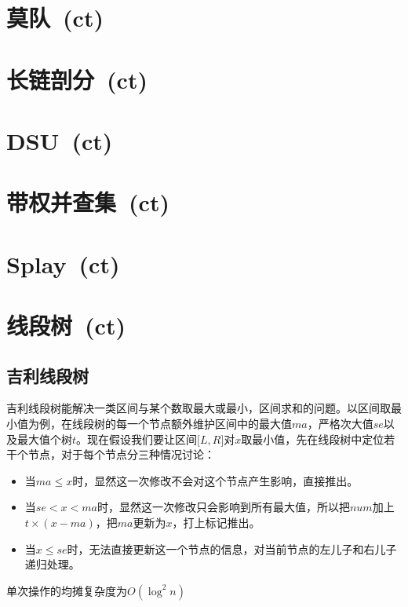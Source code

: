 \section{莫队\ \small(ct)}
\section{长链剖分\ \small(ct)}
\section{DSU\ \small(ct)}
\section{带权并查集\ \small(ct)}
\section{Splay\ \small(ct)}
\section{线段树\ \small(ct)}
    \subsection*{吉利线段树}
        吉利线段树能解决一类区间与某个数取最大或最小，区间求和的问题。以区间取最小值为例，在线段树的每一个节点额外维护区间中的最大值$ ma $，严格次大值$ se $以及最大值个树$ t $。现在假设我们要让区间$ \lbrack L, R \rbrack $对$ x $取最小值，先在线段树中定位若干个节点，对于每个节点分三种情况讨论：
        \begin{itemize}[wide=0pt]
            \item 当$ ma \leq x $时，显然这一次修改不会对这个节点产生影响，直接推出。
            \item 当$ se < x < ma $时，显然这一次修改只会影响到所有最大值，所以把$ num $加上$ t \times (x - ma) $，把$ ma $更新为$ x $，打上标记推出。
            \item 当$ x \leq se $时，无法直接更新这一个节点的信息，对当前节点的左儿子和右儿子递归处理。
        \end{itemize}
        单次操作的均摊复杂度为$ O(\log^2 n) $
